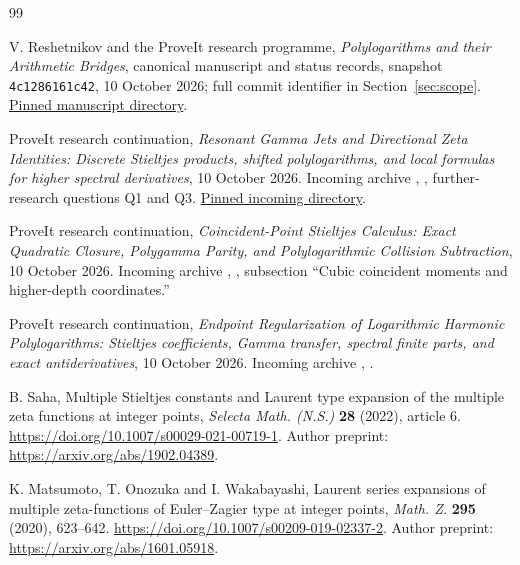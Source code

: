 \begin{thebibliography}{99}

V. Reshetnikov and the ProveIt research programme,
\emph{Polylogarithms and their Arithmetic Bridges}, canonical
manuscript and status records, snapshot \texttt{4c1286161c42},
10 October 2026; full commit identifier in Section~\ref{sec:scope}.
\href{https://github.com/VladimirReshetnikov/ProveIt/tree/4c1286161c425eca957b4b9f7cd436c37a4c98f3/Analysis/Polylogarithms/docs/manuscript}{Pinned manuscript directory}.

ProveIt research continuation,
\emph{Resonant Gamma Jets and Directional Zeta Identities:
Discrete Stieltjes products, shifted polylogarithms, and local formulas
for higher spectral derivatives}, 10 October 2026.
Incoming archive ,
, further-research questions Q1 and Q3.
\href{https://github.com/VladimirReshetnikov/ProveIt/tree/4c1286161c425eca957b4b9f7cd436c37a4c98f3/docs/incoming}{Pinned incoming directory}.

ProveIt research continuation,
\emph{Coincident-Point Stieltjes Calculus: Exact Quadratic Closure,
Polygamma Parity, and Polylogarithmic Collision Subtraction},
10 October 2026. Incoming archive
,
, subsection ``Cubic coincident moments and
higher-depth coordinates.''

ProveIt research continuation,
\emph{Endpoint Regularization of Logarithmic Harmonic Polylogarithms:
Stieltjes coefficients, Gamma transfer, spectral finite parts, and
exact antiderivatives}, 10 October 2026. Incoming archive
,
.

B. Saha, Multiple Stieltjes constants and Laurent type expansion of the
multiple zeta functions at integer points,
\emph{Selecta Math. (N.S.)} \textbf{28} (2022), article 6.
\url{https://doi.org/10.1007/s00029-021-00719-1}.
Author preprint: \url{https://arxiv.org/abs/1902.04389}.

K. Matsumoto, T. Onozuka and I. Wakabayashi,
Laurent series expansions of multiple zeta-functions of Euler--Zagier
type at integer points,
\emph{Math. Z.} \textbf{295} (2020), 623--642.
\url{https://doi.org/10.1007/s00209-019-02337-2}.
Author preprint: \url{https://arxiv.org/abs/1601.05918}.


\end{thebibliography}
